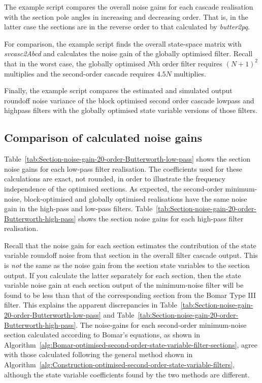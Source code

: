 \documentclass[a4paper,twoside,10pt,english]{report}
\begin{document}
The example script compares the overall noise gains for each cascade realisation
with the section pole angles in increasing and decreasing order. That is, in
the latter case the sections are in the reverse order to that calculated by
\emph{butter2pq}.

For comparison, the example script finds the overall state-space matrix with
\emph{svcasc2Abcd} and calculates the noise gain of the globally optimised
filter. Recall that in the worst case, the globally optimised $N$th order
filter requires $\left(N+1\right)^{2}$ multiplies and the second-order cascade
requires $4.5N$ multiplies.

Finally, the example script compares the estimated and simulated output
roundoff noise variance of the block optimised second order cascade lowpass
and highpass filters with the globally optimised state variable versions of
those filters.

\subsection{Comparison of calculated noise gains}
Table~\ref{tab:Section-noise-gain-20-order-Butterworth-low-pass} shows the
section noise gains for each low-pass filter realisation. The
coefficients used for these calculations are exact, not rounded, in order to
illustrate the frequency independence of the optimised sections. 
As expected, the second-order minimum-noise, block-optimised and globally
optimised realisations have the same noise gain in the high-pass and low-pass
filters. Table~\ref{tab:Section-noise-gain-20-order-Butterworth-high-pass}
shows the section noise gains for each high-pass filter realisation. 



Recall that the noise gain for each section estimates the contribution of the
state variable roundoff noise from that section in the overall filter cascade
output. This is \emph{not} the same as the noise gain from the section state
variables to the section output. If you calculate the latter separately for each
section, then the state variable noise gain at each section output of the
minimum-noise filter will be found to be less than that of the corresponding
section from the Bomar Type III filter. This explains the apparent discrepancies
in Table~\ref{tab:Section-noise-gain-20-order-Butterworth-low-pass} and
Table~\ref{tab:Section-noise-gain-20-order-Butterworth-high-pass}. The
noise-gains for each second-order minimum-noise section calculated according to
Bomar's equations, as shown in
Algorithm~\ref{alg:Bomar-optimised-second-order-state-variable-filter-sections},
agree with those calculated following the general method shown in
Algorithm~\ref{alg:Construction-optimised-second-order-state-variable-filters},
although the state variable coefficients found by the two methods are different.
\end{document}
